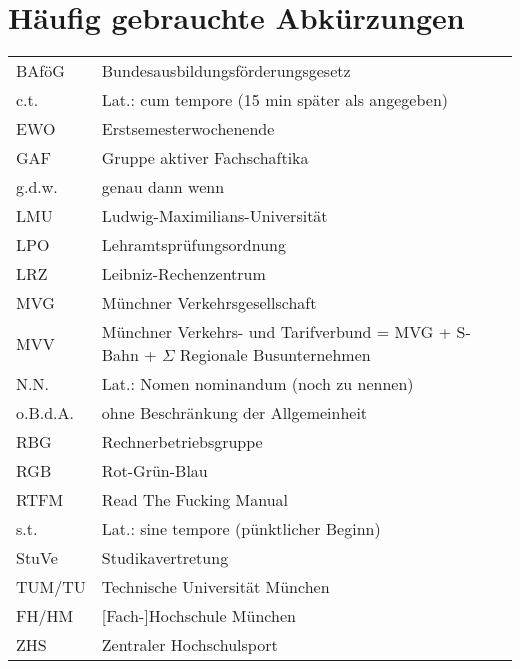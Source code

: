 ﻿
\chapter[Abkürzungen]{Häufig gebrauchte Abkürzungen}
\begin{tabular}{l p{10cm}}
BAföG        &Bundesausbildungsförderungsgesetz\\
c.t.        &Lat.: cum tempore (15 min später als angegeben)\\
EWO        &Erstsemesterwochenende\\
GAF        &Gruppe aktiver Fachschaftika\\
g.d.w.    & genau dann wenn\\
LMU        &Ludwig-Maximilians-Universität\\
LPO        &Lehramtsprüfungsordnung\\
LRZ        &Leibniz-Rechenzentrum\\
MVG    &Münchner Verkehrsgesellschaft\\
MVV    &Münchner Verkehrs- und Tarifverbund = \newline MVG + S-Bahn + $\Sigma$ Regionale Busunternehmen\\
N.N.        &Lat.: Nomen nominandum (noch zu nennen)\\
o.B.d.A.    &ohne Beschränkung der Allgemeinheit\\
RBG        &Rechnerbetriebsgruppe\\
RGB             &Rot-Grün-Blau\\
RTFM        &Read The Fucking Manual\\
s.t.        &Lat.: sine tempore (pünktlicher Beginn)\\
StuVe           &Studikavertretung\\
TUM/TU        &Technische Universität München\\
FH/HM        &[Fach-]Hochschule München\\
ZHS        &Zentraler Hochschulsport\\
\end{tabular}



